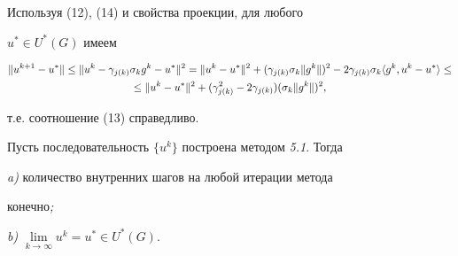 \begin{pf}
Используя (12), (14) и свойства проекции, для любого


$u^*\in U^*(G)$ имеем


\begin{multline*}


\|u^{k+1}-u^*\|\le \|u^k-\gamma_{j(k)}\sigma_kg^k-u^*\|^2=


\|u^k-u^*\|^2+(\gamma_{j(k)}\sigma_k\|g^k\|)^2-


2\gamma_{j(k)}\sigma_k\la g^k,u^k-u^*\ra\le \\


\le\|u^k-u^*\|^2+(\gamma^2_{j(k)}-2\gamma_{j(k)})


(\sigma_k\|g^k\|)^2,


\end{multline*}


т.е. соотношение (13) справедливо.


\end{pf}





\begin{thms}


Пусть последовательность $\{u^k\}$ построена методом {\em 5.1}. Тогда





{\em a)} количество внутренних шагов на любой итерации метода


конечно{\em ;}





{\em b)} $\lim\limits_{k\to\infty}u^k=u^*\in U^*(G)$.


\end{thms}





